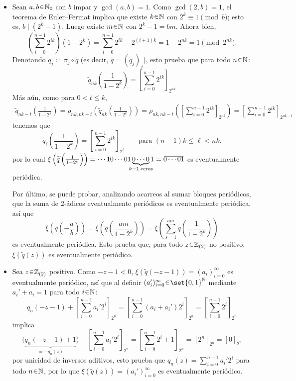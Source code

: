 \begin{sol}
\begin{itemize}
    \item Sean $a,b\en\mathbb{N}_0$ con $b$ impar y $\gcd(a,b)=1$. Como $\gcd(2,b)=1$, el teorema de Euler--Fermat implica que existe $k\en\mathbb{N}$ con $2^k\equiv1\pmod b$; esto es, $b\mid(2^k-1)$. Luego existe $m\en\mathbb{N}$ con $2^k-1=bm$. Ahora bien,
    \[
    \left(\sum_{i=0}^{n-1}2^{ik}\right)(1-2^k)
    =\sum_{i=0}^{n-1}2^{ik}-2^{(i+1)k}
    =1-2^{nk}
    =1\pmod{2^{nk}}.
    \]
    Denotando $\widetilde q_j\coloneq\pi_j\circ\widetilde q$ (es decir, $\tilde q=(\tilde q_j)_j$), esto prueba que para todo $n\en\mathbb{N}$:
    \[
    \widetilde q_{nk}\left(\frac{1}{1-2^k}\right)=\left[\sum_{i=0}^{n-1}2^{ik}\right]_{2^{nk}}
    \]
    Más aún, como para $0<t\leq k$,
    \begin{align*}
    \widetilde q_{nk-t}\left(\frac{1}{1-2^k}\right)
    =\rho_{nk,nk-t}\left(\widetilde q_{nk}\left(\frac{1}{1-2^k}\right)\right)
    =\rho_{nk,nk-t}\left(\left[\sum_{i=0}^{n-1}2^{ik}\right]_{2^{nk}}\right)
    =\left[\sum_{i=0}^{n-1}2^{ik}\right]_{2^{nk-t}}
    \end{align*}
    tenemos que
    \[
    \widetilde q_\ell\left(\frac{1}{1-2^k}\right)
    =\left[\sum_{i=0}^{n-1}2^{ik}\right]_{2^{\ell}}
    \qquad\text{para }(n-1)k\leq \ell<nk.
    \]
    por lo cual $\xi\left(\widetilde q\left(\frac{1}{1-2^k}\right)\right) = \cdots10\cdots01\underbrace{0\cdots0}_{\mathclap{k-1\;\text{ceros}}}1 = \ubar{0\cdots01}$ es eventualmente periódica.

    Por último, se puede probar, analizando acarreos al sumar bloques periódicos, que la suma de $2$-ádicos eventualmente periódicos es eventualmente periódica, así que
    \[
    \xi\left(\widetilde q\left(-\frac{a}{b}\right)\right)
    =\xi\left(\widetilde q\left(\frac{am}{1-2^k}\right)\right)
    =\xi\left(\sum_{s=1}^{am}\widetilde q\left(\frac{1}{1-2^k}\right)\right)
    \]
    es eventualmente periódica. Esto prueba que, para todo $z\en\mathbb{Z}_{(2)}$ no positivo, $\xi(\widetilde q(z))$ es eventualmente periódico.

    \item Sea $z\en\mathbb{Z}_{(2)}$ positivo. Como $-z-1<0$, $\xi(\widetilde q(-z-1))=(a_i)_{i=0}^{\infty}$ es eventualmente periódico, así que al definir $(a_i')_{i=0}^{\infty}\en\set{0,1}^{\mathbb{N}}$ mediante $a_i'+a_i=1$ para todo $i\en\mathbb{N}$:
    \[
    q_n(-z-1)+ \left[\sum_{i=0}^{n-1}a_i'2^i\right]_{2^{n}}
    = \left[\sum_{i=0}^{n-1}(a_i+a_i')2^i\right]_{2^{n}}
    = \left[\sum_{i=0}^{n-1}2^i\right]_{2^{n}}
    \]
    implica
    \[
    \bigl( \underbrace{q_n(-z-1)+1}_{= -q_n(z) } \bigr)  +  \left[ \sum_{i=0}^{n-1}a_i'2^i \right]_{2^{n}}
    = \left[\sum_{i=0}^{n-1}2^i+1\right]_{2^{n}}
    =\left[2^n\right]_{2^{n}}
    =\left[0\right]_{2^{n}}
    \]
    por unicidad de inversos aditivos, esto prueba que $q_n(z)=\sum_{i=0}^{n-1}a_i'2^i$ para todo $n\en\mathbb{N}$, por lo que $\xi(\widetilde q(z))=(a_i')_{i=0}^{\infty}$ es eventualmente periódico.
\end{itemize}


\end{sol}
